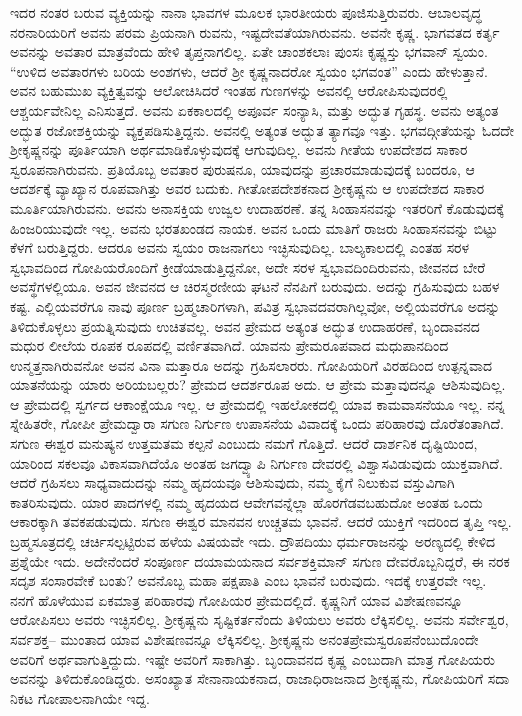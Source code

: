 ಇದರ ನಂತರ ಬರುವ ವ್ಯಕ್ತಿಯನ್ನು ನಾನಾ ಭಾವಗಳ ಮೂಲಕ ಭಾರತೀಯರು ಪೂಜಿಸುತ್ತಿರುವರು. ಆಬಾಲವೃದ್ಧ ನರನಾರಿಯರಿಗೆ ಅವನು ಪರಮ ಪ್ರಿಯನಾಗಿ ರುವನು, ಇಷ್ಟದೇವತೆಯಾಗಿರುವನು. ಅವನೇ ಕೃಷ್ಣ. ಭಾಗವತದ ಕರ್ತೃ ಅವನನ್ನು ಅವತಾರ ಮಾತ್ರವೆಂದು ಹೇಳಿ ತೃಪ್ತನಾಗಲಿಲ್ಲ. ಏತೇ ಚಾಂಶಕಲಾಃ ಪುಂಸಃ ಕೃಷ್ಣಸ್ತು ಭಗವಾನ್​ ಸ್ವಯಂ. “ಉಳಿದ ಅವತಾರಗಳು ಬರಿಯ ಅಂಶಗಳು, ಆದರೆ ಶ‍್ರೀ ಕೃಷ್ಣನಾದರೋ ಸ್ವಯಂ ಭಗವಂತ” ಎಂದು ಹೇಳುತ್ತಾನೆ. ಅವನ ಬಹುಮುಖ ವ್ಯಕ್ತಿತ್ವವನ್ನು ಆಲೋಚಿಸಿದರೆ ಇಂತಹ ಗುಣಗಳನ್ನು ಅವನಲ್ಲಿ ಆರೋಪಿಸುವುದರಲ್ಲಿ ಆಶ್ಚರ್ಯವೇನಿಲ್ಲ ಎನಿಸುತ್ತದೆ. ಅವನು ಏಕಕಾಲದಲ್ಲಿ ಅಪೂರ್ವ ಸಂನ್ಯಾಸಿ, ಮತ್ತು ಅದ್ಭುತ ಗೃಹಸ್ಥ. ಅವನು ಅತ್ಯಂತ ಅದ್ಭುತ ರಜೋಶಕ್ತಿಯನ್ನು ವ್ಯಕ್ತಪಡಿಸುತ್ತಿದ್ದನು. ಅವನಲ್ಲಿ ಅತ್ಯಂತ ಅದ್ಭುತ ತ್ಯಾಗವೂ ಇತ್ತು. ಭಗವದ್ಗೀತೆಯನ್ನು ಓದದೇ ಶ‍್ರೀಕೃಷ್ಣನನ್ನು ಪೂರ್ತಿಯಾಗಿ ಅರ್ಥಮಾಡಿಕೊಳ್ಳುವುದಕ್ಕೆ ಆಗುವುದಿಲ್ಲ. ಅವನು ಗೀತೆಯ ಉಪದೇಶದ ಸಾಕಾರ ಸ್ವರೂಪನಾಗಿರುವನು. ಪ್ರತಿಯೊಬ್ಬ ಅವತಾರ ಪುರುಷನೂ, ಯಾವುದನ್ನು ಪ್ರಚಾರಮಾಡುವುದಕ್ಕೆ ಬಂದರೂ, ಆ ಆದರ್ಶಕ್ಕೆ ವ್ಯಾಖ್ಯಾನ ರೂಪವಾಗಿತ್ತು ಅವರ ಬದುಕು. ಗೀತೋಪದೇಶಕನಾದ ಶ‍್ರೀಕೃಷ್ಣನು ಆ ಉಪದೇಶದ ಸಾಕಾರ ಮೂರ್ತಿಯಾಗಿರುವನು. ಅವನು ಅನಾಸಕ್ತಿಯ ಉಜ್ವಲ ಉದಾಹರಣೆ. ತನ್ನ ಸಿಂಹಾಸನವನ್ನು ಇತರರಿಗೆ ಕೊಡುವುದಕ್ಕೆ ಹಿಂಜರಿಯುವುದೇ ಇಲ್ಲ. ಅವನು ಭರತಖಂಡದ ನಾಯಕ. ಅವನ ಒಂದು ಮಾತಿಗೆ ರಾಜರು ಸಿಂಹಾಸನವನ್ನು ಬಿಟ್ಟು ಕೆಳಗೆ ಬರುತ್ತಿದ್ದರು. ಆದರೂ ಅವನು ಸ್ವಯಂ ರಾಜನಾಗಲು ಇಚ್ಛಿಸುವುದಿಲ್ಲ. ಬಾಲ್ಯಕಾಲದಲ್ಲಿ ಎಂತಹ ಸರಳ ಸ್ವಭಾವದಿಂದ ಗೋಪಿಯರೊಂದಿಗೆ ಕ್ರೀಡೆಯಾಡುತ್ತಿದ್ದನೋ, ಅದೇ ಸರಳ ಸ್ವಭಾವದಿಂದಿರುವನು, ಜೀವನದ ಬೇರೆ ಅವಸ್ಥೆಗಳಲ್ಲಿಯೂ. ಅವನ ಜೀವನದ ಆ ಚಿರಸ್ಮರಣೀಯ ಘಟನೆ ನೆನಪಿಗೆ ಬರುವುದು. ಅದನ್ನು ಗ್ರಹಿಸುವುದು ಬಹಳ ಕಷ್ಟ. ಎಲ್ಲಿಯವರೆಗೂ ನಾವು ಪೂರ್ಣ ಬ್ರಹ್ಮಚಾರಿಗಳಾಗಿ, ಪವಿತ್ರ ಸ್ವಭಾವದವರಾಗಿಲ್ಲವೋ, ಅಲ್ಲಿಯವರೆಗೂ ಅದನ್ನು ತಿಳಿದುಕೊಳ್ಳಲು ಪ್ರಯತ್ನಿಸುವುದು ಉಚಿತವಲ್ಲ. ಅವನ ಪ್ರೇಮದ ಅತ್ಯಂತ ಅದ್ಭುತ ಉದಾಹರಣೆ, ಬೃಂದಾವನದ ಮಧುರ ಲೀಲೆಯ ರೂಪಕ ರೂಪದಲ್ಲಿ ವರ್ಣಿತವಾಗಿದೆ. ಯಾವನು ಪ್ರೇಮರೂಪವಾದ ಮಧುಪಾನದಿಂದ ಉನ್ಮತ್ತನಾಗಿರುವನೋ ಅವನ ವಿನಾ ಮತ್ತಾರೂ ಅದನ್ನು ಗ್ರಹಿಸಲಾರರು. ಗೋಪಿಯರಿಗೆ ವಿರಹದಿಂದ ಉತ್ಪನ್ನವಾದ ಯಾತನೆಯನ್ನು ಯಾರು ಅರಿಯಬಲ್ಲರು? ಪ್ರೇಮದ ಆದರ್ಶರೂಪ ಅದು. ಆ ಪ್ರೇಮ ಮತ್ತಾವುದನ್ನೂ ಆಶಿಸುವುದಿಲ್ಲ. ಆ ಪ್ರೇಮದಲ್ಲಿ ಸ್ವರ್ಗದ ಆಕಾಂಕ್ಷೆಯೂ ಇಲ್ಲ. ಆ ಪ್ರೇಮದಲ್ಲಿ ಇಹಲೋಕದಲ್ಲಿ ಯಾವ ಕಾಮವಾಸನೆಯೂ ಇಲ್ಲ. ನನ್ನ ಸ್ನೇಹಿತರೇ, ಗೋಪೀ ಪ್ರೇಮದ್ವಾರಾ ಸಗುಣ ನಿರ್ಗುಣ ಉಪಾಸನೆಯ ವಿವಾದಕ್ಕೆ ಒಂದು ಪರಿಹಾರವು ದೊರೆತಂತಾಗಿದೆ. ಸಗುಣ ಈಶ್ವರ ಮನುಷ್ಯನ ಉತ್ತಮತಮ ಕಲ್ಪನೆ ಎಂಬುದು ನಮಗೆ ಗೊತ್ತಿದೆ. ಆದರೆ ದಾರ್ಶನಿಕ ದೃಷ್ಟಿಯಿಂದ, ಯಾರಿಂದ ಸಕಲವೂ ವಿಕಾಸವಾಗಿದೆಯೊ ಅಂತಹ ಜಗದ್ವ್ಯಾಪಿ ನಿರ್ಗುಣ ದೇವರಲ್ಲಿ ವಿಶ್ವಾಸವಿಡುವುದು ಯುಕ್ತವಾಗಿದೆ. ಆದರೆ ಗ್ರಹಿಸಲು ಸಾಧ್ಯವಾದುದನ್ನು ನಮ್ಮ ಹೃದಯವೂ ಆಶಿಸುವುದು, ನಮ್ಮ ಕೈಗೆ ನಿಲುಕುವ ವಸ್ತುವಿಗಾಗಿ ಕಾತರಿಸುವುದು. ಯಾರ ಪಾದಗಳಲ್ಲಿ ನಮ್ಮ ಹೃದಯದ ಆವೇಗವನ್ನೆಲ್ಲಾ ಹೊರಗೆಡವಬಹುದೋ ಅಂತಹ ಒಂದು ಆಕಾರಕ್ಕಾಗಿ ತವಕಪಡುವುದು. ಸಗುಣ ಈಶ್ವರ ಮಾನವನ ಉಚ್ಚತಮ ಭಾವನೆ. ಆದರೆ ಯುಕ್ತಿಗೆ ಇದರಿಂದ ತೃಪ್ತಿ ಇಲ್ಲ. ಬ್ರಹ್ಮಸೂತ್ರದಲ್ಲಿ ಚರ್ಚಿಸಲ್ಪಟ್ಟಿರುವ ಹಳೆಯ ವಿಷಯವೇ ಇದು. ದ್ರೌಪದಿಯು ಧರ್ಮರಾಜನನ್ನು ಅರಣ್ಯದಲ್ಲಿ ಕೇಳಿದ ಪ್ರಶ್ನೆಯೇ ಇದು. ಅದೇನೆಂದರೆ ಸಂಪೂರ್ಣ ದಯಾಮಯನಾದ ಸರ್ವಶಕ್ತಿಮಾನ್​ ಸಗುಣ ದೇವರೊಬ್ಬನಿದ್ದರೆ, ಈ ನರಕ ಸದೃಶ ಸಂಸಾರವೇಕೆ ಬಂತು? ಅವನೊಬ್ಬ ಮಹಾ ಪಕ್ಷಪಾತಿ ಎಂಬ ಭಾವನೆ ಬರುವುದು. ಇದಕ್ಕೆ ಉತ್ತರವೇ ಇಲ್ಲ. ನನಗೆ ಹೊಳೆಯುವ ಏಕಮಾತ್ರ ಪರಿಹಾರವು ಗೋಪಿಯರ ಪ್ರೇಮದಲ್ಲಿದೆ. ಕೃಷ್ಣನಿಗೆ ಯಾವ ವಿಶೇಷಣವನ್ನೂ ಆರೋಪಿಸಲು ಅವರು ಇಚ್ಛಿಸಲಿಲ್ಲ. ಶ‍್ರೀಕೃಷ್ಣನು ಸೃಷ್ಟಿಕರ್ತನೆಂದು ತಿಳಿಯಲು ಅವರು ಲೆಕ್ಕಿಸಲಿಲ್ಲ. ಅವನು ಸರ್ವೇಶ್ವರ, ಸರ್ವಶಕ್ತ– ಮುಂತಾದ ಯಾವ ವಿಶೇಷಣವನ್ನೂ ಲೆಕ್ಕಿಸಲಿಲ್ಲ. ಶ‍್ರೀಕೃಷ್ಣನು ಅನಂತಪ್ರೇಮಸ್ವರೂಪನೆಂಬುದೊಂದೇ ಅವರಿಗೆ ಅರ್ಥವಾಗುತ್ತಿದ್ದುದು. ಇಷ್ಟೇ ಅವರಿಗೆ ಸಾಕಾಗಿತ್ತು. ಬೃಂದಾವನದ ಕೃಷ್ಣ ಎಂಬುದಾಗಿ ಮಾತ್ರ ಗೋಪಿಯರು ಅವನನ್ನು ತಿಳಿದುಕೊಂಡಿದ್ದರು. ಅಸಂಖ್ಯಾತ ಸೇನಾನಾಯಕನಾದ, ರಾಜಾಧಿರಾಜನಾದ ಶ‍್ರೀಕೃಷ್ಣನು, ಗೋಪಿಯರಿಗೆ ಸದಾ ನಿಕಟ ಗೋಪಾಲನಾಗಿಯೇ ಇದ್ದ.


